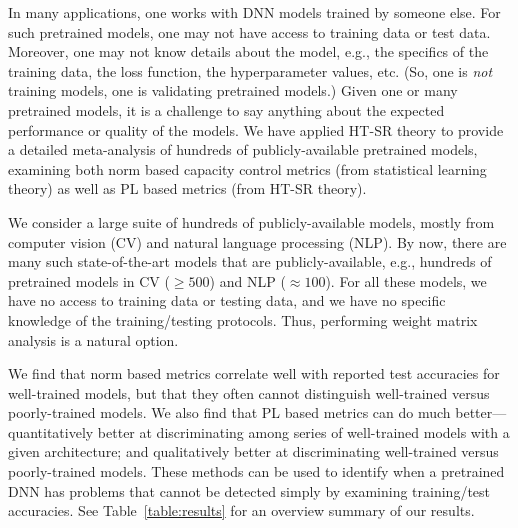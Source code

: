 \documentclass{article}
\begin{document}
In many applications, one works with DNN models trained by someone else.
For such pretrained models, one may not have access to training data or test data.
Moreover, one may not know details about the model, e.g., the specifics of the training data, the loss function, the hyperparameter values, etc.
(So, one is \emph{not} training models, one is validating pretrained models.)
Given one or many pretrained models, it is a challenge to say anything about the expected performance or quality of the models.
We have applied HT-SR theory to provide a detailed meta-analysis of hundreds of publicly-available pretrained models, examining both norm based capacity control metrics (from statistical learning theory) as well as PL based metrics (from HT-SR theory).

We consider a large suite of hundreds of publicly-available models, mostly from computer vision (CV) and natural language processing (NLP).
By now, there are many such state-of-the-art models that are publicly-available, e.g., 
hundreds of pretrained models in CV ($\ge 500$) and NLP ($\approx 100$).
For all these models, we have no access to training data or testing data, and we have no specific knowledge of the training/testing protocols. 
Thus, performing weight matrix analysis is a natural option.


We find that norm based metrics correlate well with reported test accuracies for well-trained models, but that they often cannot distinguish well-trained versus poorly-trained models.
We also find that PL based metrics can do much better---quantitatively better at discriminating among series of well-trained models with a given architecture; and qualitatively better at discriminating well-trained versus poorly-trained models.
These methods can be used to identify when a pretrained DNN has problems that cannot be detected simply by examining training/test accuracies.
%
See Table~\ref{table:results} for an overview summary of our results.
\end{document}
